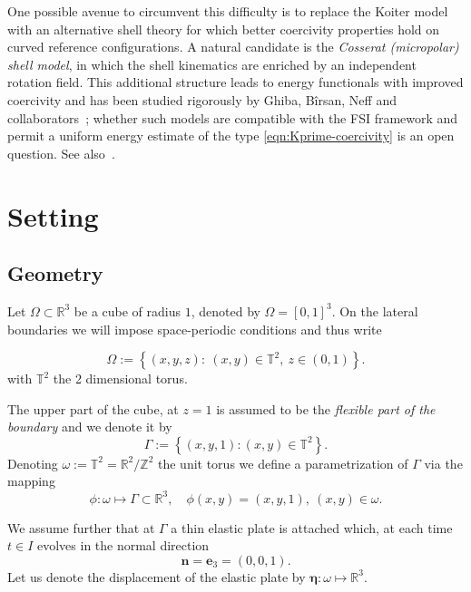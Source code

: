 \documentclass[10pt,a4paper]{article}
\numberwithin{equation}{section}
\begin{document}
One possible avenue to circumvent this difficulty is to replace the Koiter model with
an alternative shell theory for which better coercivity properties hold on curved
reference configurations. A natural candidate is the \emph{Cosserat (micropolar) shell
model}, in which the shell kinematics are enriched by an independent rotation field.
This additional structure leads to energy functionals with improved coercivity and
has been studied rigorously by Ghiba, B\^{i}rsan, Neff and
collaborators~\cite{GhibaBirsanNeff2023, GhibaNeff2023, MohammadiSaemGhibaNeff2023};
whether such models are compatible with the FSI framework and permit a uniform
energy estimate of the type \eqref{eqn:Kprime-coercivity} is an open question. See also~\cite{ghiba2026nonlinearkirchhoffloveshellmodels}.

\section{Setting}\label{sec:setting}
\subsection{Geometry}

Let $\Omega \subset \mathbb{R}^{3}$ be a cube of radius $1$, denoted by $\Omega=\left[0,1\right]^{3}$. On the lateral boundaries we will impose space-periodic conditions and thus write



\begin{equation*}
\Omega:=\left\{ \left(x,y,z\right):\ \left(x,y\right)\in\mathbb{T}^{2},\ z\in\left(0,1\right)\right\} . 
\end{equation*}
with $\mathbb{T}^{2}$ the 2 dimensional torus.

The upper part of the cube, at $z=1$ is assumed to be  the \emph{flexible part of the boundary} and we denote it by
\begin{equation}
\Gamma:=\left\{ \left(x,y,1\right):\left(x,y\right)\in\mathbb{T}^{2}\right\} .
\end{equation}
Denoting $\omega:=\mathbb{T}^{2}=\mathbb{R}^{2}/\mathbb{Z}^{2}$ the unit torus we define a parametrization of $\Gamma$ via the mapping \[
\phi:\omega\mapsto\Gamma\subset\mathbb{R}^{3},\quad\phi\left(x,y\right)=\left(x,y,1\right),\ \left(x,y\right)\in\omega.\] 

We assume further that at $\Gamma$ a thin elastic plate is attached which,  
at each time $t\in I$  evolves in the  normal direction 
\[
\mathbf{n}=\mathbf{e}_{3}=(0,0,1).
\]
Let us denote
the displacement of the elastic plate by $\boldsymbol{\eta}:\omega \mapsto \mathbb{R}^{3}$.
\end{document}
